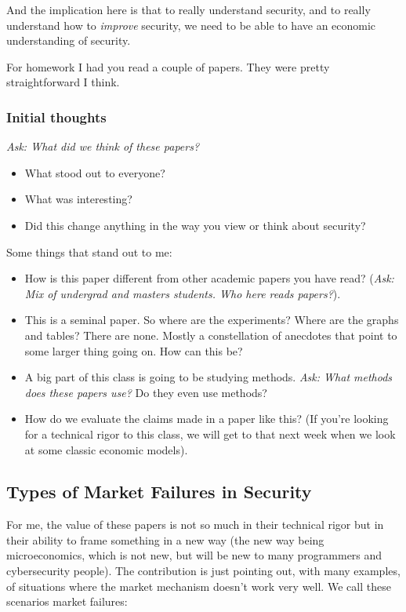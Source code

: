 \documentclass[11pt]{article}
\begin{document}
And the implication here is that to really understand security, and to really understand how to \textit{improve} security, we need to be able to have an economic understanding of security. 

For homework I had you read a couple of papers. They were pretty straightforward I think.

\subsubsection{Initial thoughts}

{\it Ask: What did we think of these papers?}

\begin{itemize}
    \item What stood out to everyone?
    \item What was interesting?
    \item Did this change anything in the way you view or think about security?
\end{itemize}

Some things that stand out to me:

\begin{itemize}
    \item How is this paper different from other academic papers you have read? ({\it Ask: Mix of undergrad and masters students. Who here reads papers?}). 
    \item This is a seminal paper. So where are the experiments? Where are the graphs and tables? There are none. Mostly a constellation of anecdotes that point to some larger thing going on. How can this be?
    \item A big part of this class is going to be studying methods. {\it Ask: What methods does these papers use?} Do they even use methods?
    \item How do we evaluate the claims made in a paper like this?  (If you're looking for a technical rigor to this class, we will get to that next week when we look at some classic economic models).
  
\end{itemize}

\subsection{Types of Market Failures in Security}

For me, the value of these papers is not so much in their technical rigor but in their ability to frame something in a new way (the new way being microeconomics, which is not new, but will be new to many programmers and cybersecurity people). The contribution is just pointing out, with many examples, of situations where the market mechanism doesn't work very well. We call these scenarios market failures:
\end{document}
